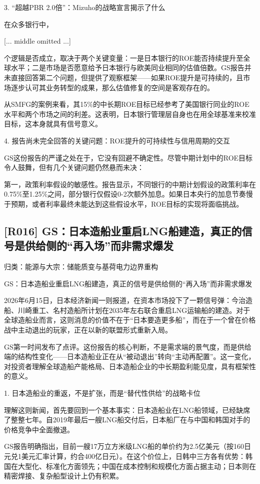 \documentclass[11pt]{ctexart}
\begin{document}
3. “超越PBR 2.0倍”：Mizuho的战略宣言揭示了什么

在众多银行中，

[... middle omitted ...]

个逻辑是否成立，取决于两个关键变量：一是日本银行的ROE能否持续提升至全球水平；二是市场是否愿意给予日本银行与欧美同业相同的估值倍数。GS报告并未直接回答第二个问题，但提供了观察框架——如果ROE提升是可持续的，且市场逐步认可其业务转型的成果，那么估值修复的空间是客观存在的。

从SMFG的案例来看，其15\%的中长期ROE目标已经参考了美国银行同业的ROE水平和两个市场之间的利差。这表明，日本银行管理层自身也在用全球基准来校准目标，这本身就具有信号意义。

4. 报告尚未完全回答的关键问题：ROE提升的可持续性与信用周期的交互

GS这份报告的严谨之处在于，它没有回避不确定性。尽管中期计划中的ROE目标令人鼓舞，但有几个关键问题仍然悬而未决：

第一，政策利率假设的敏感性。报告显示，不同银行的中期计划假设的政策利率在0.75\%至1.25\%之间，部分银行仅假设0-2次额外加息。如果日本央行的加息节奏慢于预期，或者利率最终未能达到这些假设水平，ROE目标的实现将面临挑战。

\subsection{[R016] GS：日本造船业重启LNG船建造，真正的信号是供给侧的“再入场”而非需求爆发}
{\small\color{refgray}归类：能源与大宗：储能质变与基荷电力边界重构}

GS：日本造船业重启LNG船建造，真正的信号是供给侧的“再入场”而非需求爆发

2026年6月15日，日本经济新闻一则报道，在资本市场投下了一颗信号弹：今治造船、川崎重工、名村造船所计划在2035年左右联合重启LNG运输船的建造。对于全球造船业而言，这则消息的价值不在于“日本要造更多船”，而在于一个曾在价格战中主动退出的玩家，正在以新的联盟形式重新入局。

GS第一时间发布了点评。这份报告的核心判断，不是需求端的景气度，而是供给端的结构性变化——日本造船业正在从“被动退出”转向“主动再配置”。这一变化，对投资者理解全球造船产能格局、日本造船企业的中长期盈利能见度，具有框架性的意义。

1. 日本造船业的重返，不是扩张，而是“替代性供给”的战略卡位

理解这则新闻，首先要回到一个基本事实：日本造船业在LNG船领域，已经缺席了整整七年。自2019年最后一艘LNG船交付后，日本船厂在与中国和韩国对手的价格竞争中全面撤退。

GS报告明确指出，目前一艘17万立方米级LNG船的单价约为2.5亿美元（按160日元兑1美元汇率计算，约合400亿日元）。在这个价位上，日韩中三方各有优势：韩国在大型化、标准化方面领先；中国在成本控制和规模化方面占据主动；日本则在精密焊接、复杂船型设计上仍有积累。
\end{document}

